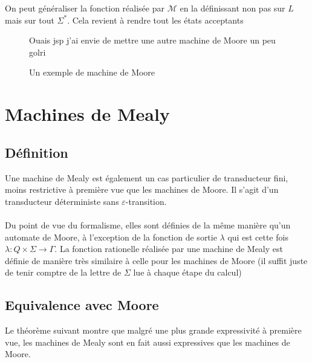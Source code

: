 \documentclass{scrartcl}
\begin{document}
\begin{flushleft}
On peut généraliser la fonction réalisée par $\mathcal{M}$ en la définissant non pas sur $L$ mais sur tout
$\Sigma^*$. Cela revient à rendre tout les états acceptants

\begin{figure}[h]
    \caption{Un exemple de machine de Moore}
    \begin{center}
        Ouais jsp j'ai envie de mettre une autre machine de Moore un peu golri
        \begin{tikzpicture}[auto, node distance = 1.5cm]

        \end{tikzpicture}
    \end{center}
\end{figure}

\vspace*{2cm}

\section{Machines de Mealy}

\subsection{Définition}

Une machine de Mealy est également un cas particulier de transducteur fini, moins restrictive à première vue que les machines de Moore.
Il s'agit d'un transducteur déterministe sans $\varepsilon$-transition.
\\~\\
Du point de vue du formalisme, elles sont définies de la même manière qu'un automate de Moore, à l'exception de la fonction de sortie
$\lambda$ qui est cette fois $\lambda : Q \times \Sigma \rightarrow \Gamma$. La fonction rationelle réalisée par une machine de Mealy
est définie de manière très similaire à celle pour les machines de Moore (il suffit juste de tenir comptre de la lettre de $\Sigma$ lue à chaque
étape du calcul)


\subsection{Equivalence avec Moore}

Le théorème suivant montre que malgré une plus grande expressivité à première vue, les machines de Mealy sont en fait aussi expressives que les machines
de Moore.


\end{flushleft}
\end{document}
